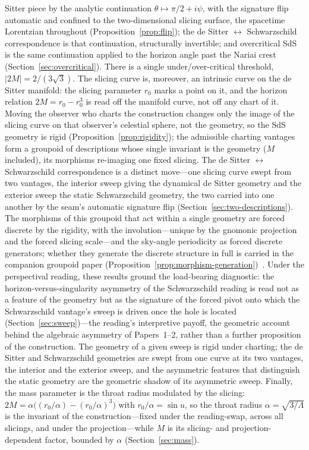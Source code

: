 \documentclass[11pt,a4paper]{article}
\theoremstyle{definition}
\begin{document}
Sitter piece by the analytic continuation $\theta\mapsto\pi/2+i\psi$, with the signature flip automatic and confined to the two-dimensional slicing surface, the spacetime Lorentzian throughout (Proposition~\ref{prop:flip}); the de Sitter $\leftrightarrow$ Schwarzschild correspondence is that continuation, structurally invertible; and overcritical SdS is the same continuation applied to the horizon angle past the Nariai crest (Section~\ref{sec:overcritical}). There is a single under/over-critical threshold, $|2M|=2/(3\sqrt3)$. The slicing curve is, moreover, an intrinsic curve on the de Sitter manifold: the slicing parameter $r_{0}$ marks a point on it, and the horizon relation $2M=r_{0}-r_{0}^{3}$ is read off the manifold curve, not off any chart of it. Moving the observer who charts the construction changes only the image of the slicing curve on that observer's celestial sphere, not the geometry, so the SdS geometry is rigid (Proposition~\ref{prop:rigidity}); the admissible charting vantages form a groupoid of descriptions whose single invariant is the geometry ($M$ included), its morphisms re-imaging one fixed slicing. The de Sitter $\leftrightarrow$ Schwarzschild correspondence is a distinct move---one slicing curve swept from two vantages, the interior sweep giving the dynamical de Sitter geometry and the exterior sweep the static Schwarzschild geometry, the two carried into one another by the seam's automatic signature flip (Section~\ref{sec:two-descriptions}). The morphisms of this groupoid that act within a single geometry are forced discrete by the rigidity, with the involution---unique by the gnomonic projection and the forced slicing scale---and the sky-angle periodicity as forced discrete generators; whether they generate the discrete structure in full is carried in the companion groupoid paper (Proposition~\ref{prop:morphism-generation})~\cite{JanzenGroupoid}. Under the perspectival reading, these results ground the load-bearing diagnostic: the horizon-versus-singularity asymmetry of the Schwarzschild reading is read not as a feature of the geometry but as the signature of the forced pivot onto which the Schwarzschild vantage's sweep is driven once the hole is located (Section~\ref{sec:sweep})---the reading's interpretive payoff, the geometric account behind the algebraic asymmetry of Papers~1--2, rather than a further proposition of the construction. The geometry of a given sweep is rigid under charting; the de Sitter and Schwarzschild geometries are swept from one curve at its two vantages, the interior and the exterior sweep, and the asymmetric features that distinguish the static geometry are the geometric shadow of its asymmetric sweep. Finally, the mass parameter is the throat radius modulated by the slicing: $2M=\alpha\bigl((r_{0}/\alpha)-(r_{0}/\alpha)^{3}\bigr)$ with $r_{0}/\alpha=\sin u$, so the throat radius $\alpha=\sqrt{3/\Lambda}$ is the invariant of the construction---fixed under the reading-swap, across all slicings, and under the projection---while $M$ is its slicing- and projection-dependent factor, bounded by $\alpha$ (Section~\ref{sec:mass}).
\end{document}
